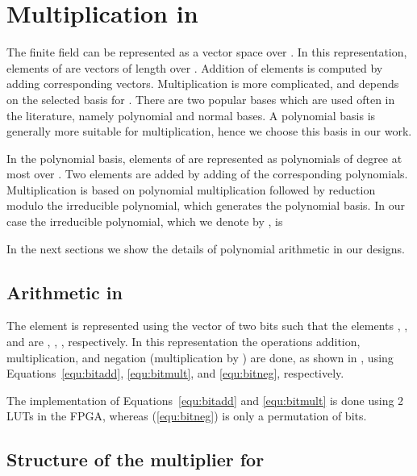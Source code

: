 \documentclass{article}
\begin{document}
\section{Multiplication in }
\label{sec:multf397}

The finite field  can be represented as a vector space
over . In this representation, elements of  are
vectors of length  over . Addition of elements is computed
by adding corresponding vectors. Multiplication is more complicated,
and depends on the selected basis for . There are two
popular bases which are used often in the literature, namely
polynomial and normal bases. 
A polynomial basis is generally more suitable for multiplication,
hence we choose this basis in our work. 

In the polynomial basis, elements of  are represented as
polynomials of degree at most  over . Two elements are added
by adding of the corresponding polynomials. Multiplication is based on polynomial
multiplication followed by reduction modulo the irreducible polynomial,
which generates the polynomial basis. In our case the irreducible
polynomial, which we denote by , is 

In the next sections we show the details of polynomial arithmetic in
our designs.

\subsection{Arithmetic in }

The element  is represented using the vector  of two bits such that the elements , , and  are
, , , respectively. In this representation the
operations addition, multiplication, and negation (multiplication by
) are done, as shown in \cite{grapag05}, using
Equations~\ref{equ:bitadd}, \ref{equ:bitmult}, and \ref{equ:bitneg},
respectively. 

The implementation of Equations~\ref{equ:bitadd} and \ref{equ:bitmult}
is done using 2 LUTs in the FPGA, whereas (\ref{equ:bitneg}) is only a
permutation of bits.

\subsection{Structure of the multiplier for }
\end{document}
